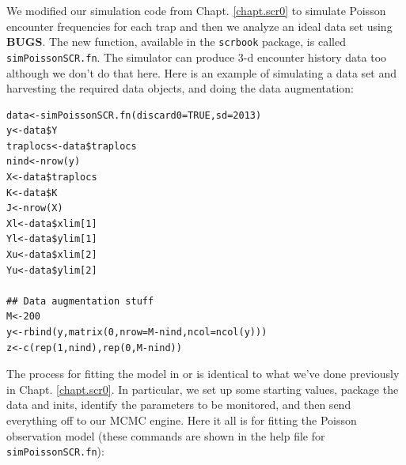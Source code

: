 We modified our simulation code from Chapt. \ref{chapt.scr0} to
simulate Poisson encounter frequencies for each trap and then we
analyze an ideal data set using {\bf BUGS}. The new function,
available in the \mbox{\tt scrbook} package, is called {\tt
  simPoissonSCR.fn}.  The simulator can produce 3-d encounter history
data too although we don't do that here.  Here is an example of
simulating a data set and harvesting the required data objects, and
doing the data augmentation:

{\small
\begin{verbatim}
data<-simPoissonSCR.fn(discard0=TRUE,sd=2013)
y<-data$Y
traplocs<-data$traplocs
nind<-nrow(y)
X<-data$traplocs
K<-data$K
J<-nrow(X)
Xl<-data$xlim[1]
Yl<-data$ylim[1]
Xu<-data$xlim[2]
Yu<-data$ylim[2]

## Data augmentation stuff
M<-200
y<-rbind(y,matrix(0,nrow=M-nind,ncol=ncol(y)))
z<-c(rep(1,nind),rep(0,M-nind))
\end{verbatim}
}

The process for fitting
the model in \winbugs  or \jags is identical to what we've done
previously in Chapt. \ref{chapt.scr0}. In particular, we set up some
starting values, package the data and inits, identify the parameters
to be monitored, and then send everything off to our MCMC engine. Here
it all is for fitting the Poisson observation model (these commands
are shown in the help file for \mbox{\tt simPoissonSCR.fn}):

